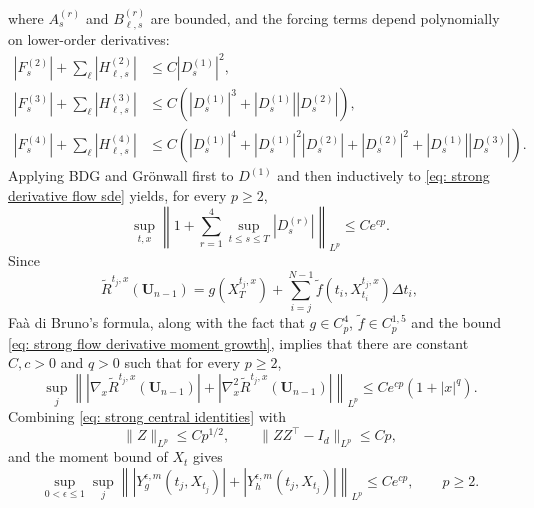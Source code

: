 \documentclass[twoside,11pt]{article}
\newcommand{\1}{\mathbf{1}}
\numberwithin{equation}{section}
\begin{document}
where $A_s^{(r)}$ and $B_{\ell,s}^{(r)}$ are bounded, and the forcing terms depend polynomially on lower-order derivatives:
\[
\begin{aligned}
    |F_s^{(2)}|+\sum_{\ell}|H_{\ell,s}^{(2)}|
    &\le C|D_s^{(1)}|^2,                                      \\
    |F_s^{(3)}|+\sum_{\ell}|H_{\ell,s}^{(3)}|
    &\le C\left(|D_s^{(1)}|^3+|D_s^{(1)}||D_s^{(2)}|\right),     \\
    |F_s^{(4)}|+\sum_{\ell}|H_{\ell,s}^{(4)}|
    &\le C\left(|D_s^{(1)}|^4+|D_s^{(1)}|^2|D_s^{(2)}|
    +|D_s^{(2)}|^2+|D_s^{(1)}||D_s^{(3)}|\right).
\end{aligned}
\]
Applying BDG and Gr\"onwall first to $D^{(1)}$ and then inductively to \eqref{eq: strong derivative flow sde} yields, for every $p\ge2$,
\begin{equation}\label{eq: strong flow derivative moment growth}
    \sup_{t,x}
    \left\|
    1+\sum_{r=1}^4\sup_{t\le s\le T}|D_s^{(r)}|
    \right\|_{L^p}
    \le
    C e^{cp}.
\end{equation}
Since
\[
    \tilde R^{t_j,x}(\mathbf{U}_{n-1})
    =
    g(X_T^{t_j,x})
    +
     \sum_{i = j}^{N-1}\tilde f(t_i,X_{t_i}^{t_j,x})\Delta t_i,
\]
Fa\`a di Bruno's formula, along with the fact that  $g\in C_p^4$, $\tilde f\in C_p^{1,5}$ and the bound \eqref{eq: strong flow derivative moment growth}, implies that there are constant $ C,c>0$ and $ q>0$ such that for every $ p\ge 2$, 
\begin{equation}\label{eq: strong reward derivative moment growth}
    \sup_{j}
    \left\|
    |\nabla_x\tilde R^{t_j,x}(\mathbf{U}_{n-1})|
    +|\nabla_x^2\tilde R^{t_j,x}(\mathbf{U}_{n-1})|
    \right\|_{L^p}
    \le
    C e^{cp}(1+ |x|^q).
\end{equation}
Combining \eqref{eq: strong central identities} with
\[
    \|Z\|_{L^p}\le Cp^{1/2},
    \qquad
    \|ZZ^\top-I_d\|_{L^p}\le Cp,
\]
and the moment bound of $ X_t$ gives
\begin{equation}\label{eq: strong target moment growth}
    \sup_{0<\epsilon\le1}\sup_{j}
    \left\|
    |Y_g^{\epsilon,m}(t_j,X_{t_j})|
    +
    |Y_h^{\epsilon,m}(t_j,X_{t_j})|
    \right\|_{L^p}
    \le
    C e^{cp},
    \qquad p\ge2.
\end{equation}
\end{document}
